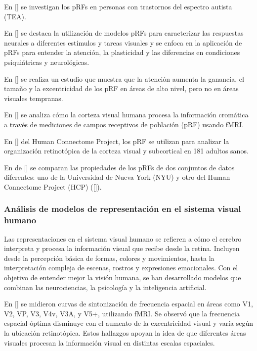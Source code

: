 En [\cite{schwarzkopf_larger_2014}] se investigan los pRFs en personas con trastornos del espectro autista (TEA). 

En [\cite{wandell_computational_2015}] se destaca la utilizaci\'on de modelos pRFs para caracterizar las respuestas neurales a diferentes est\'imulos y tareas visuales y se enfoca en la aplicación de pRFs para entender la atención, la plasticidad y las diferencias en condiciones psiquiátricas y neurológicas.

En [\cite{kay_attention_2015}] se realiza un estudio que muestra que la atención aumenta la ganancia, el tamaño y la excentricidad de los pRF en áreas de alto nivel, pero no en áreas visuales tempranas.

En [\cite{welbourne_population_2018}] se analiza cómo la corteza visual humana procesa la información cromática a través de mediciones de campos receptivos de población (pRF) usando fMRI. 

En [\cite{benson_human_2018}] del Human Connectome Project, los pRF se utilizan para analizar la organización retinotópica de la corteza visual y subcortical en 181 adultos sanos. 

En de [\cite{himmelberg_cross-dataset_2021}] se comparan las propiedades de los pRFs de dos conjuntos de datos diferentes: uno de la Universidad de Nueva York (NYU) y otro del Human Connectome Project (HCP) ([\cite{benson_human_2018}]).  



\subsubsection*{An\'alisis de modelos de representaci\'on en el sistema visual humano}

Las representaciones en el sistema visual humano se refieren a cómo el cerebro interpreta y procesa la información visual que recibe desde la retina. Incluyen desde la percepción básica de formas, colores y movimientos, hasta la interpretación compleja de escenas, rostros y expresiones emocionales. Con el objetivo de entender mejor la visi\'on humana, se han desarrollado modelos que combinan las neurociencias, la psicología y la inteligencia artificial.

En [\cite{henriksson_spatial_2008}]  se midieron curvas de sintonización de frecuencia espacial en áreas como V1, V2, VP, V3, V4v, V3A, y V5+, utilizando fMRI. Se observ\'o que la frecuencia espacial óptima disminuye con el aumento de la excentricidad visual y varía según la ubicación retinotópica. Estos hallazgos apoyan la idea de que diferentes áreas visuales procesan la información visual en distintas escalas espaciales.

